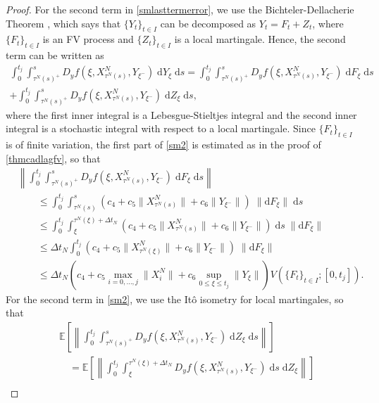 \documentclass[reqno,12pt]{amsart}
\theoremstyle{plain} %
\theoremstyle{definition} %
\begin{document}
\begin{proof}
    For the second term in \eqref{smlasttermerror}, we use the Bichteler-Dellacherie Theorem \cite[Theorem III.47]{Protter2005}, which says that $\{Y_t\}_{t\in I}$ can be decomposed as $Y_t = F_t + Z_t$, where $\{F_t\}_{t\in I}$ is an FV process and $\{Z_t\}_{t\in I}$ is a local martingale. Hence, the second term can be written as
    \begin{multline}
        \label{sm2}
        \int_0^{t_j} \int_{\tau^N(s)^+}^s D_y f(\xi, X_{\tau^N(s)}^N, Y_{\xi^-}) \;\mathrm{d}Y_\xi \;\mathrm{d}s = \int_0^{t_j} \int_{\tau^N(s)^+}^s D_y f(\xi, X_{\tau^N(s)}^N, Y_{\xi^-}) \;\mathrm{d}F_\xi \;\mathrm{d}s \\  
        + \int_0^{t_j} \int_{\tau^N(s)^+}^s D_y f(\xi, X_{\tau^N(s)}^N, Y_{\xi^-}) \;\mathrm{d}Z_\xi \;\mathrm{d}s,
    \end{multline}
    where the first inner integral is a Lebesgue-Stieltjes integral and the second inner integral is a stochastic integral with respect to a local martingale. Since $\{F_t\}_{t\in I}$ is of finite variation, the first part of \eqref{sm2} is estimated as in the proof of \cref{thmcadlagfv}, so that
    \begin{align*}
        & \left\|\int_0^{t_j} \int_{\tau^N(s)^+}^s D_y f(\xi, X_{\tau^N(s)}^N, Y_{\xi^-}) \;\mathrm{d}F_\xi\;\mathrm{d}s\right\| \\
        & \qquad \leq \int_0^{t_j} \int_{\tau^N(s)}^s \left(c_4 + c_5 \|X_{\tau^N(s)}^N\| + c_6\|Y_{\xi^-}\|\right)\;\|\mathrm{d}F_\xi\|\;\mathrm{d}s \\
        & \qquad \leq \int_0^{t_j} \int_{\xi}^{\tau^N(\xi) + \Delta t_N} \left(c_4 + c_5 \|X_{\tau^N(s)}^N\| + c_6\|Y_{\xi^-}\|\right)\;\mathrm{d}s\;\|\mathrm{d}F_\xi\| \\
        & \qquad \leq \Delta t_N\int_0^{t_j} \left(c_4 + c_5 \|X_{\tau^N(\xi)}^N\| + c_6\|Y_{\xi^-}\|\right)\;\|\mathrm{d}F_\xi\| \\
        & \qquad \leq \Delta t_N\left(c_4 + c_5 \max_{i=0, \ldots, j}\|X_{i}^N\| + c_6\sup_{0\leq \xi \leq t_j}\|Y_{\xi}\|\right)V(\{F_t\}_{t\in I}; [0, t_j]).
    \end{align*}
    For the second term in \eqref{sm2}, we use the It\^o isometry for local martingales, so that
    \begin{align*}
        & \mathbb{E}\left[\left\|\int_0^{t_j} \int_{\tau^N(s)^+}^s D_y f(\xi, X_{\tau^N(s)}^N, Y_{\xi^-}) \;\mathrm{d}Z_\xi\;\mathrm{d}s\right\|\right] \\
        & \quad = \mathbb{E}\left[\left\|\int_0^{t_j} \int_{\xi}^{\tau^N(\xi) + \Delta t_N} D_y f(\xi, X_{\tau^N(s)}^N, Y_{\xi^-}) \;\mathrm{d}s \;\mathrm{d}Z_\xi\right\|\right] \\

\end{align*}
\end{proof}
\end{document}

